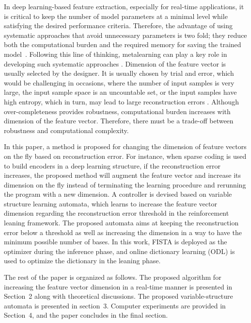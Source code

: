 \documentclass[journal]{IEEEtran}
\begin{document}
In deep learning-based feature extraction, especially for real-time applications, it is critical to keep the number of model parameters at a minimal level while satisfying the desired performance criteria. Therefore, the advantage of using systematic approaches that avoid unnecessary parameters is two fold; they reduce both the computational burden and the required memory for saving the trained model~\cite{Deng2013, Squeezdet}. Following this line of thinking, metalearning can play a key role in developing such systematic approaches \cite{Clune2020}. Dimension of the feature vector is usually selected by the designer. It is usually chosen by trial and error, which would be challenging in occasions, where the number of input samples is very large, the input sample space is an uncountable set, or the input samples have high entropy, which in turn, may lead to large reconstruction errors \cite{cognitivecontrol2012, fatemi2017observability}. Although over-completeness provides robustness, computational burden increases with dimension of the feature vector. Therefore, there must be a trade-off between robustness and computational complexity.

In this paper, a method is proposed for changing the dimension of feature vectors on the fly based on reconstruction error. For instance, when sparse coding is used to build encoders in a deep learning structure, if the reconstruction error increases, the proposed method will augment the feature vector and increase its dimension on the fly instead of terminating the learning procedure and rerunning the program with a new dimension. A controller is devised based on variable structure learning automata, which learns to increase the feature vector dimension regarding the reconstruction error threshold in the reinforcement leaning framework. The proposed automata aims at keeping the reconstruction error below a threshold as well as increasing the dimension in a way to have the minimum possible number of bases. In this work, FISTA is deployed as the optimizer during the inference phase, and online dictionary learning (ODL) is used to optimize the dictionary in the leaning phase.

The rest of the paper is organized as follows. The proposed algorithm for increasing the feature vector dimension in a real-time manner is presented in Section~2 along with theoretical discussions. The proposed variable-structure automata is presented in section~3. Computer experiments are provided in Section~4, and the paper concludes in the final section.
\end{document}
